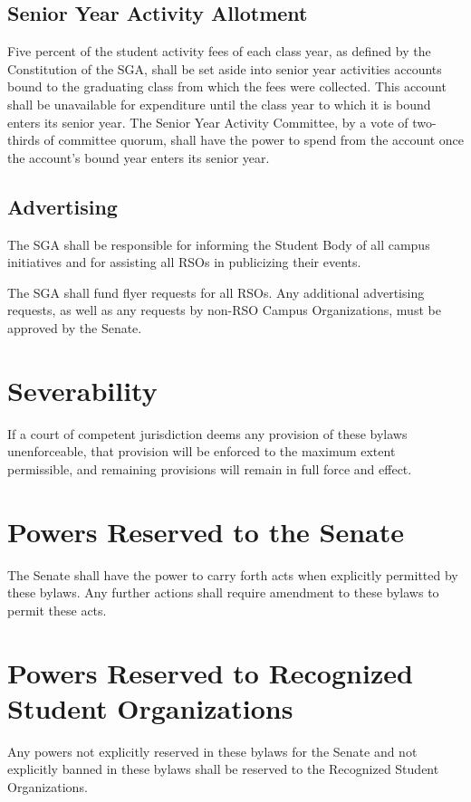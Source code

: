 \documentclass[12pt]{scrreprt}
\begin{document}
\section{Senior Year Activity Allotment}
Five percent of the student activity fees of each class year, as defined by 
the Constitution of the SGA, shall be set aside into senior year activities 
accounts bound to the graduating class from which the fees were collected. 
This account shall be unavailable for expenditure until the class year to 
which it is bound enters its senior year. The Senior Year Activity Committee, 
by a vote of two-thirds of committee quorum, shall have the power to spend 
from the account once the account's bound year enters its senior year. 

\section{Advertising}
The SGA shall be responsible for informing the Student Body of all campus 
initiatives and for assisting all RSOs in publicizing their events. 

The SGA shall fund flyer requests for all RSOs. Any additional advertising 
requests, as well as any requests by non-RSO Campus Organizations, must be 
approved by the Senate. 

\chapter{Severability}
If a court of competent jurisdiction deems any provision of these bylaws 
unenforceable, that provision will be enforced to the maximum extent 
permissible, and remaining provisions will remain in full force and effect. 

\chapter{Powers Reserved to the Senate} \label{sec:senate_powers}
The Senate shall have the power to carry forth acts when explicitly permitted 
by these bylaws. Any further actions shall require amendment to these bylaws 
to permit these acts. 

\chapter{Powers Reserved to Recognized Student Organizations} \label{sec:rso_powers}
Any powers not explicitly reserved in these bylaws for the Senate and not 
explicitly banned in these bylaws shall be reserved to the Recognized Student 
Organizations.
\end{document}
